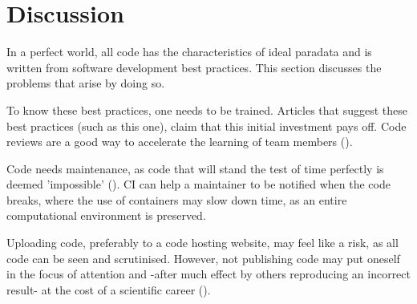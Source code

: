 \section{Discussion}

In a perfect world, all code has the characteristics of ideal paradata
and is written from software development best practices.
This section discusses the problems that arise by doing so.


To know these best practices, one needs to be trained. 
Articles that suggest these best practices (such as this one), 
claim that this initial investment pays off.
Code reviews are a good way to accelerate the 
learning of team members (\cite{vable2021code}).


Code needs maintenance,
as code that will stand the test of time perfectly 
is deemed 'impossible' (\cite{benureau2018re}).
CI can help a maintainer to be notified when the code breaks,
where the use of containers may slow down time,
as an entire computational environment is preserved.


Uploading code, preferably to a code hosting website, 
may feel like a risk, as all code can be seen and scrutinised.
However, not publishing code may put 
oneself in the focus of attention
and -after much effect by others reproducing an incorrect result-
at the cost of a scientific career (\cite{baggerly2009deriving}).


